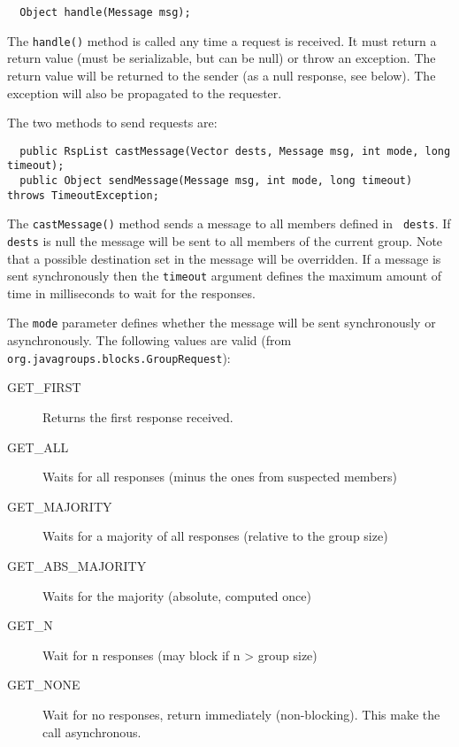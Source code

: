   \begin{small}
  \begin{verbatim}
  Object handle(Message msg);
  \end{verbatim}
  \end{small}

  The {\tt handle()} method is called any time a request is received. It must return
  a return value (must be serializable, but can be null) or throw an exception. The
  return value will be returned to the sender (as a null response, see below). The
  exception will also be propagated to the requester.

  The two methods to send requests are:

  \begin{small}
  \begin{verbatim}
  public RspList castMessage(Vector dests, Message msg, int mode, long timeout);
  public Object sendMessage(Message msg, int mode, long timeout) throws TimeoutException;
  \end{verbatim}
  \end{small}

  The {\tt castMessage()} method sends a message to all members defined in {\tt
  dests}. If {\tt dests} is null the message will be sent to all members of the
  current group. Note that a possible destination set in the message will be
  overridden. If a message is sent synchronously then the {\tt timeout} argument
  defines the maximum amount of time in milliseconds to wait for the responses.

  The {\tt mode} parameter defines whether the message will be sent synchronously or
  asynchronously. The following values are valid (from {\tt org.javagroups.blocks.GroupRequest}):

  \begin{description}
  \item[GET\_FIRST] Returns the first response received.
  \item[GET\_ALL] Waits for all responses (minus the ones from suspected members)
  \item[GET\_MAJORITY] Waits for a majority of all responses (relative to the group size)
  \item[GET\_ABS\_MAJORITY] Waits for the majority (absolute, computed once)
  \item[GET\_N] Wait for n responses (may block if n > group size)
  \item[GET\_NONE] Wait for no responses, return immediately (non-blocking). This
                   make the call asynchronous.
  \end{description}

